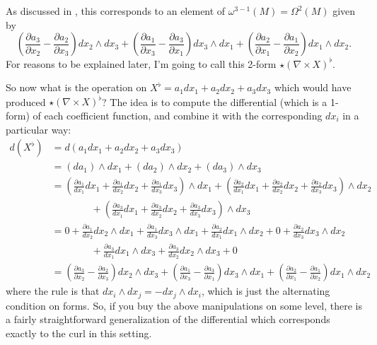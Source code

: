 As discussed in , this corresponds to an element of $\omega^{3-1}(M) = \Omega^2(M)$ given by
\[
	\left(\frac{\partial a_3}{\partial x_2} - \frac{\partial a_2}{\partial x_3} \right)dx_2 \wedge dx_3 + \left( \frac{\partial a_1}{\partial x_3} - \frac{\partial a_3}{\partial x_1} \right) dx_3 \wedge dx_1 + \left( \frac{\partial a_2}{\partial x_1} - \frac{\partial a_1}{\partial x_2} \right) dx_1 \wedge dx_2.
\]
For reasons to be explained later, I'm going to call this 2-form $\star (\nabla \times X)^\flat$.

So now what is the operation on $X^\flat = a_1 dx_1 + a_2 dx_2 + a_3 dx_3$ which would have produced $\star (\nabla \times X)^\flat$? The idea is to compute the differential (which is a 1-form) of each coefficient function, and combine it with the corresponding $dx_i$ in a particular way:
\begin{align*}
	d(X^\flat) & = d(a_1 dx_1 + a_2 dx_2 + a_3 dx_3) \\
	& = (da_1) \wedge dx_1 + (da_2) \wedge dx_2 + (da_3) \wedge dx_3 \\
	& = \left( \frac{\partial a_1}{dx_1} dx_1  + \frac{\partial a_1}{dx_2} dx_2 + \frac{\partial a_1}{dx_3} dx_3 \right)\wedge dx_1 + \left( \frac{\partial a_2}{dx_1} dx_1  + \frac{\partial a_2}{dx_2} dx_2 + \frac{\partial a_2}{dx_3} dx_3 \right)\wedge dx_2 \\
	& \qquad \qquad + \left( \frac{\partial a_3}{dx_1} dx_1  + \frac{\partial a_3}{dx_2} dx_2 + \frac{\partial a_3}{dx_3} dx_3 \right)\wedge dx_3 \\
	& = 0 + \frac{\partial a_1}{dx_2} dx_2 \wedge dx_1 + \frac{\partial a_1}{dx_3} dx_3 \wedge dx_1 + \frac{\partial a_2}{dx_1} dx_1 \wedge dx_2 + 0 + \frac{\partial a_2}{dx_3} dx_3 \wedge dx_2 \\
	& \qquad \qquad + \frac{\partial a_3}{dx_1} dx_1 \wedge dx_3 + \frac{\partial a_3}{dx_2} dx_2 \wedge dx_3 + 0 \\
	& = \left(\frac{\partial a_3}{\partial x_2} - \frac{\partial a_2}{\partial x_3} \right)dx_2 \wedge dx_3 + \left( \frac{\partial a_1}{\partial x_3} - \frac{\partial a_3}{\partial x_1} \right) dx_3 \wedge dx_1 + \left( \frac{\partial a_2}{\partial x_1} - \frac{\partial a_1}{\partial x_2} \right) dx_1 \wedge dx_2
\end{align*}
where the rule is that $dx_i \wedge dx_j = - dx_j \wedge dx_i$, which is just the alternating condition on forms. So, if you buy the above manipulations on some level, there is a fairly straightforward generalization of the differential which corresponds exactly to the curl in this setting.

